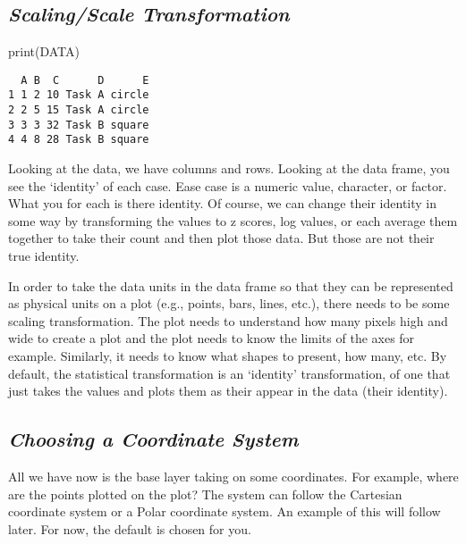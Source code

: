 \documentclass[
  letterpaper,
  DIV=11,
  numbers=noendperiod]{scrartcl}
\newenvironment{Shaded}{\begin{snugshade}}{\end{snugshade}}
\newcommand{\FunctionTok}[1]{\textcolor[rgb]{0.28,0.35,0.67}{#1}}
\newcommand{\NormalTok}[1]{\textcolor[rgb]{0.00,0.23,0.31}{#1}}
\begin{document}
\hypertarget{scalingscale-transformation}{%
\subsection{\texorpdfstring{\emph{Scaling/Scale
Transformation}}{Scaling/Scale Transformation}}\label{scalingscale-transformation}}

\begin{Shaded}
\begin{Highlighting}[]
\FunctionTok{print}\NormalTok{(DATA)}
\end{Highlighting}
\end{Shaded}

\begin{verbatim}
  A B  C      D      E
1 1 2 10 Task A circle
2 2 5 15 Task A circle
3 3 3 32 Task B square
4 4 8 28 Task B square
\end{verbatim}

Looking at the data, we have columns and rows. Looking at the data
frame, you see the `identity' of each case. Ease case is a numeric
value, character, or factor. What you for each is there identity. Of
course, we can change their identity in some way by transforming the
values to z scores, log values, or each average them together to take
their count and then plot those data. But those are not their true
identity.

In order to take the data units in the data frame so that they can be
represented as physical units on a plot (e.g., points, bars, lines,
etc.), there needs to be some scaling transformation. The plot needs to
understand how many pixels high and wide to create a plot and the plot
needs to know the limits of the axes for example. Similarly, it needs to
know what shapes to present, how many, etc. By default, the statistical
transformation is an `identity' transformation, of one that just takes
the values and plots them as their appear in the data (their identity).

\hypertarget{choosing-a-coordinate-system}{%
\subsection{\texorpdfstring{\emph{Choosing a Coordinate
System}}{Choosing a Coordinate System}}\label{choosing-a-coordinate-system}}

All we have now is the base layer taking on some coordinates. For
example, where are the points plotted on the plot? The system can follow
the Cartesian coordinate system or a Polar coordinate system. An example
of this will follow later. For now, the default is chosen for you.
\end{document}
